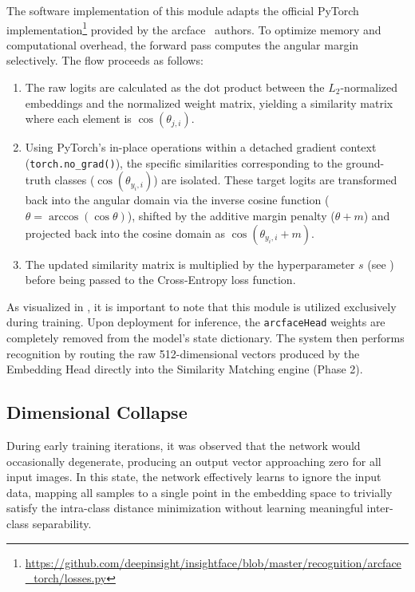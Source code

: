 The software implementation of this module adapts the official PyTorch implementation\footnote{\url{https://github.com/deepinsight/insightface/blob/master/recognition/arcface_torch/losses.py}} provided by the \ac{arcface}~\cite{deng2022arcface} authors. To optimize memory and computational overhead, the forward pass computes the angular margin selectively. The flow proceeds as follows:
\begin{enumerate}
    \item {} The raw logits are calculated as the dot product between the $L_2$-normalized embeddings and the normalized weight matrix, yielding a similarity matrix where each element is $\cos(\theta_{j, i})$.
    \item {} Using PyTorch's in-place operations within a detached gradient context (\texttt{torch.no\_grad()}), the specific similarities corresponding to the ground-truth classes ($\cos(\theta_{y_i, i})$) are isolated. These target logits are transformed back into the angular domain via the inverse cosine function ($\theta = \arccos(\cos\theta)$), shifted by the additive margin penalty ($\theta + m$) and projected back into the cosine domain as $\cos(\theta_{y_i, i} + m)$.
    \item {} The updated similarity matrix is multiplied by the hyperparameter $s$ (see ) before being passed to the Cross-Entropy loss function.
\end{enumerate}

As visualized in , it is important to note that this module is utilized exclusively during training. Upon deployment for inference, the \texttt{\ac{arcface}Head} weights are completely removed from the model's state dictionary. The system then performs recognition by routing the raw 512-dimensional vectors produced by the Embedding Head directly into the Similarity Matching engine (Phase 2).

\subsection{Dimensional Collapse}
During early training iterations, it was observed that the network would occasionally degenerate, producing an output vector approaching zero for all input images. In this state, the network effectively learns to ignore the input data, mapping all samples to a single point in the embedding space to trivially satisfy the intra-class distance minimization without learning meaningful inter-class separability.

